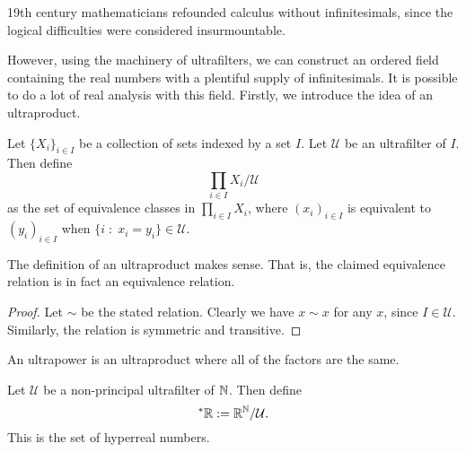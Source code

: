 \documentclass{owmaths}
\begin{document}
19th century mathematicians refounded calculus without infinitesimals,
since the logical difficulties were considered insurmountable.

However, using the machinery of ultrafilters, we can construct
an ordered field containing the real numbers with a plentiful
supply of infinitesimals. It is possible to do a lot of real analysis with this
field. Firstly, we introduce the idea of an ultraproduct.
\begin{definition}
    Let $\{X_i\}_{i \in I}$ be a collection of sets indexed by a set $I$. 
    Let $\mathcal{U}$ be an ultrafilter of $I$. Then define
    \begin{equation*}
        \prod_{i\in I} X_i/\mathcal{U}
    \end{equation*}
    as the set of equivalence classes in $\prod_{i \in I} X_i$, where
    $(x_i)_{i \in I}$ is equivalent to $(y_i)_{i \in I}$
    when $\{ i\;:\;x_i = y_i\} \in \mathcal{U}$.
\end{definition}

\begin{proposition}
    The definition of an ultraproduct makes sense. That is, the claimed
    equivalence relation is in fact an equivalence relation.
\end{proposition}
\begin{proof}
    Let $\sim$ be the stated relation. Clearly we have $x \sim x$
    for any $x$, since $I \in \mathcal{U}$. Similarly, the relation
    is symmetric and transitive.
\end{proof}

An ultrapower is an ultraproduct where all of the factors are the same.
\begin{definition}
    Let $\mathcal{U}$ be a non-principal ultrafilter of $\mathbb{N}$. Then define
    \begin{equation*}
        ^*\mathbb{R} := \mathbb{R}^{\mathbb{N}}/\mathcal{U}.
    \end{equation*}
    This is the set of hyperreal numbers.
\end{definition}
\end{document}
